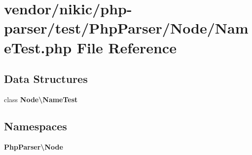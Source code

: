 \section{vendor/nikic/php-\/parser/test/\+Php\+Parser/\+Node/\+Name\+Test.php File Reference}
\label{_name_test_8php}
\subsection*{Data Structures}
\begin{DoxyCompactItemize}
\item 
class {\bf Node\textbackslash{}\+Name\+Test}
\end{DoxyCompactItemize}
\subsection*{Namespaces}
\begin{DoxyCompactItemize}
\item 
 {\bf Php\+Parser\textbackslash{}\+Node}
\end{DoxyCompactItemize}
